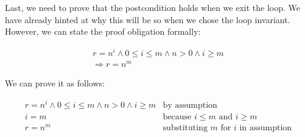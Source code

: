 \documentclass[11pt]{article}
\begin{document}
Last, we need to prove that the postcondition holds when we exit the
loop.  We have already hinted at why this will be so when we chose the
loop invariant.  However, we can state the proof obligation formally:

\[
\begin{array}{l}
r=n^i \land 0 \le i \le m \land n > 0  \land i \ge m\\
\Rightarrow r=n^m
\end{array}
\]

We can prove it as follows:

\[
\begin{array}{ll}
r=n^i \land 0 \le i \le m \land n > 0  \land i \ge m & \mbox{by assumption}\\
i = m & \mbox{because $i \le m$ and $i \ge m$}\\
r=n^m & \mbox{substituting $m$ for $i$ in assumption}\\
\end{array}
\]

\end{document}
